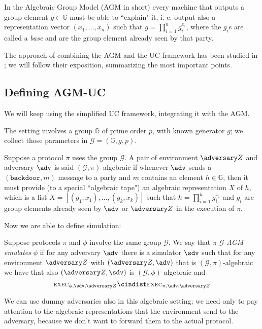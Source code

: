 In the Algebraic Group Model (AGM in short) every machine that outputs a group element $g\in\mathbb G$ must be able to ``explain" it, i. e. output also a representation vector $(x_1,\dots,x_n)$ such that $g=\prod_{i=1}^n g_i^{x_i}$, where the $g_i$s are called a \emph{base} and are the group element already seen by that party.

The approach of combining the AGM and the UC framework has been studied in \cite{AGM_UC}; we will follow their exposition, summarizing the most important points.

\subsection{Defining AGM-UC}

We will keep using the simplified UC framework, integrating it with the AGM.

The setting involves a group $\mathbb G$ of prime order $p$, with known generator $g$; we collect those parameters in $\mathcal G=(\mathbb G, g, p)$.

\begin{definition}
    Suppose a protocol $\pi$ uses the group $\mathcal G$. A pair of environment $\zdv$ and adversary $\adv$ is said $(\mathcal G,\pi)$-algebraic if whenever $\adv$ sends a $(\texttt{backdoor}, m)$ message to a party and $m$ contains an element $h\in\mathbb G$, then it must provide (to a special ``algebraic tape") an algebraic representation $X$ of $h$, which is a list $X=[(g_1,x_1),\dots,(g_k,x_k)]$ such that $h=\prod_{i=1}^kg_i^{x_i}$ and $g_i$ are group elements already seen by $\adv$ or $\zdv$ in the execution of $\pi$.
\end{definition}

Now we are able to define simulation:

\begin{definition}
    Suppose protocols $\pi$ and $\phi$ involve the same group $\mathcal G$. We say that $\pi$ \emph{$\mathcal G$-AGM emulates} $\phi$ if for any adversary $\adv$ there is a simulator $\sdv$ such that for any environment $\zdv$ with $(\zdv,\adv)$ that is $(\mathcal G, \pi)$-algebraic we have that also $(\zdv,\sdv)$ is $(\mathcal G, \phi)$-algebraic and
    $$\textsc{\scriptsize EXEC}_{\phi,\sdv,\zdv} \cindist \textsc{\scriptsize EXEC}_{\pi,\adv,\zdv}$$
\end{definition}

We can use dummy adversaries also in this algebraic setting; we need only to pay attention to the algebraic representations that the environment send to the adversary, because we don't want to forward them to the actual protocol.

